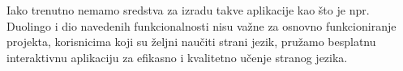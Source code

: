 Iako trenutno nemamo sredstva za izradu takve aplikacije kao što je npr. Duolingo i dio navedenih funkcionalnosti nisu važne za osnovno funkcioniranje projekta, korisnicima koji su željni naučiti strani jezik, pružamo besplatnu interaktivnu aplikaciju za efikasno i kvalitetno učenje stranog jezika.

	